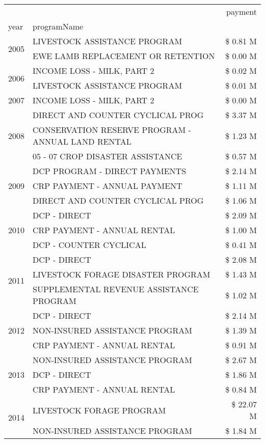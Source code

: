 \begin{tabular}{llr}
\toprule
 &  & payment \\
year & programName &  \\
\midrule
\multirow[t]{2}{*}{2005} & LIVESTOCK ASSISTANCE PROGRAM & \$ 0.81 M \\
 & EWE LAMB REPLACEMENT OR RETENTION & \$ 0.00 M \\
\cline{1-3}
\multirow[t]{2}{*}{2006} & INCOME LOSS - MILK, PART 2 & \$ 0.02 M \\
 & LIVESTOCK ASSISTANCE PROGRAM & \$ 0.01 M \\
\cline{1-3}
2007 & INCOME LOSS - MILK, PART 2 & \$ 0.00 M \\
\cline{1-3}
\multirow[t]{3}{*}{2008} & DIRECT AND COUNTER CYCLICAL PROG & \$ 3.37 M \\
 & CONSERVATION RESERVE PROGRAM - ANNUAL LAND RENTAL & \$ 1.23 M \\
 & 05 - 07 CROP DISASTER ASSISTANCE & \$ 0.57 M \\
\cline{1-3}
\multirow[t]{3}{*}{2009} & DCP PROGRAM - DIRECT PAYMENTS & \$ 2.14 M \\
 & CRP PAYMENT - ANNUAL PAYMENT & \$ 1.11 M \\
 & DIRECT AND COUNTER CYCLICAL PROG & \$ 1.06 M \\
\cline{1-3}
\multirow[t]{3}{*}{2010} & DCP - DIRECT & \$ 2.09 M \\
 & CRP PAYMENT - ANNUAL RENTAL & \$ 1.00 M \\
 & DCP - COUNTER CYCLICAL & \$ 0.41 M \\
\cline{1-3}
\multirow[t]{3}{*}{2011} & DCP - DIRECT & \$ 2.08 M \\
 & LIVESTOCK FORAGE DISASTER PROGRAM & \$ 1.43 M \\
 & SUPPLEMENTAL REVENUE ASSISTANCE PROGRAM & \$ 1.02 M \\
\cline{1-3}
\multirow[t]{3}{*}{2012} & DCP - DIRECT & \$ 2.14 M \\
 & NON-INSURED ASSISTANCE PROGRAM & \$ 1.39 M \\
 & CRP PAYMENT - ANNUAL RENTAL & \$ 0.91 M \\
\cline{1-3}
\multirow[t]{3}{*}{2013} & NON-INSURED ASSISTANCE PROGRAM & \$ 2.67 M \\
 & DCP - DIRECT & \$ 1.86 M \\
 & CRP PAYMENT - ANNUAL RENTAL & \$ 0.84 M \\
\cline{1-3}
\multirow[t]{3}{*}{2014} & LIVESTOCK FORAGE PROGRAM & \$ 22.07 M \\
 & NON-INSURED ASSISTANCE PROGRAM & \$ 1.84 M \\

\end{tabular}
